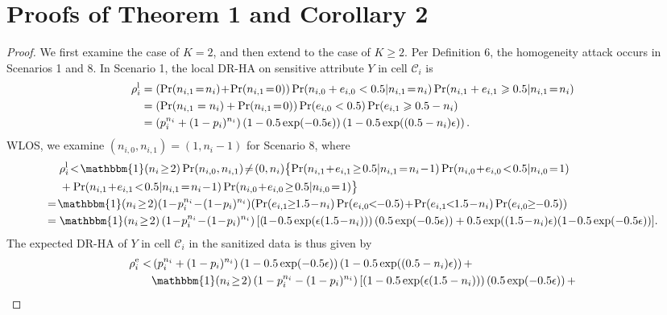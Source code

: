 \documentclass[10pt,journal,compsoc]{IEEEtran}
\newcommand{\C}{\mathcal{C}}
\begin{document}
\section{\large  Proofs of Theorem 1 and Corollary 2}\label{rho.lap.proof}
\begin{proof}
We first examine the case of $K=2$, and then extend to the case of $K\ge2$. 
Per Definition 6, the homogeneity attack occurs in Scenarios 1 and 8. In Scenario 1, the local DR-HA on sensitive attribute $Y$ in cell $\C_i$ is
\begin{align*}
\rho^{\text{l}}_i&=(\Pr(n_{i,1}\!=\!n_i)\!+\!\Pr(n_{i,1}\!=\!0))\Pr(n_{i,0}+e_{i,0}<0.5|n_{i,1}\!=\!n_i)\Pr(n_{i,1}+e_{i,1}\geqslant0.5|n_{i,1}\!=\!n_i)\notag\\
&=(\Pr(n_{i,1}=n_{i})+\Pr(n_{i,1}\!=\!0))\Pr(e_{i,0}<0.5)\Pr(e_{i,1}\geqslant0.5-n_i)\notag\\
&=\left(p_i^{n_i}+(1-p_i)^{n_i}\right)\left(1-0.5\exp(-0.5\epsilon)\right)\left(1-0.5\exp((0.5-n_i)\epsilon)\right).
\end{align*}
WLOS, we examine $(n_{i,0},n_{i,1})=(1,n_i-1)$ for Scenario 8, where
\small\begin{align*}
&\rho^{\text{l}}_i\!<\!\mathbbm{1}(n_i\!\ge\!2)\Pr(n_{i,0},n_{i,1})\!\neq\!(0,n_i)\big\{\!\Pr(n_{i,1}\!+\!e_{i,1}\!\geq\!0.5|n_{i,1}\!=\!n_i\!-\!1)\Pr(n_{i,0}\!+\!e_{i,0}\!<\!0.5|n_{i,0}\!=\!1)\\
&+\Pr(n_{i,1}\!+\!e_{i,1}\!<\!0.5|n_{i,1}\!=\!n_i\!-\!1)\Pr(n_{i,0}\!+\!e_{i,0}\!\geq\!0.5|n_{i,0}\!=\!1)\big\}\\
=\;&\!\mathbbm{1}(n_i\!\ge\!2)(1\!-\!p_i^{n_i}\!-\!(1\!-\!p_i)^{n_i})\!\left(\Pr(e_{i,1}\!\!\geq\!\!1.5\!-\!n_i)\Pr(e_{i,0}\!\!<\!\!-0.5)\!+\!\Pr(e_{i,1}\!\!<\!\!1.5\!-\!n_i)\Pr(e_{i,0}\!\!\geq\!\!-0.5)\right)\\
=\;&\mathbbm{1}(n_i\!\ge\!2)\left(1\!-\!p_i^{n_i}\!-\!(1\!-\!p_i)^{n_i}\right)[\left(\!1\!-\!0.5\exp(\epsilon(1.5\!-\!n_i))\right)\left(0.5\exp(-0.5\epsilon)\right)+0.5\exp((1.5\!-\!n_i)\epsilon)(1\!-\!0.5\exp(-0.5\epsilon))].
\end{align*}
\normalsize The expected DR-HA of $Y$ in cell $\C_i$ in the sanitized data is thus given by
\begin{align*}
    \rho^{\text{e}}_i<&\left(p_i^{n_i}+(1-p_i)^{n_i}\right)\left(1-0.5\exp(-0.5\epsilon)\right)\left(1-0.5\exp((0.5-n_i)\epsilon)\right)+\\
    &\mathbbm{1}(n_i\!\ge\!2)\left(1-p_i^{n_i}-(1-p_i)^{n_i}\right)[\left(1-0.5\exp(\epsilon(1.5-n_i))\right)\left(0.5\exp(-0.5\epsilon)\right)+\\

\end{align*}
\end{proof}
\end{document}
